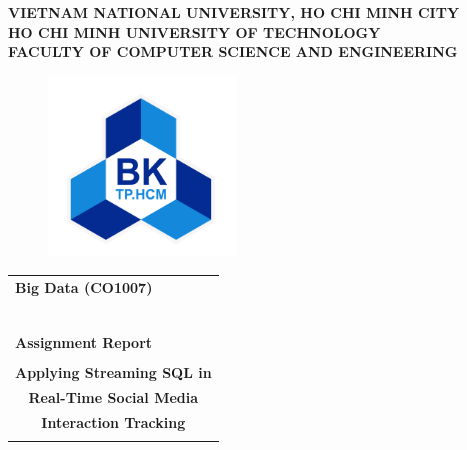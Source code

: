 \documentclass[12pt, a4paper]{article}
\begin{document}
\begin{titlepage}

    \begin{center}
        \large \textbf{VIETNAM NATIONAL UNIVERSITY, HO CHI MINH CITY} \\
        \large \textbf{HO CHI MINH UNIVERSITY OF TECHNOLOGY} \\
        \large \textbf{FACULTY OF COMPUTER SCIENCE AND ENGINEERING}
    \end{center}

    \begin{figure}[h!]
        \begin{center}
            \includegraphics[width=5cm]{Images/hcmut.png}
        \end{center}
    \end{figure}

    \begin{center}
        \begin{tabular}{c}
        \multicolumn{1}{l}{\textbf{{\Large Big Data (CO1007)}}}\\
        ~~\\
        \hline
        \\
        \multicolumn{1}{l}{\textbf{{\Large Assignment Report}}}\\
        \\
        \textbf{{\Huge Applying Streaming SQL in}}\\
        \textbf{{\Huge Real-Time Social Media}}\\
        \textbf{{\Huge Interaction Tracking}}\\
        \\
        \hline
        \end{tabular}
        \end{center}


\end{titlepage}
\end{document}
